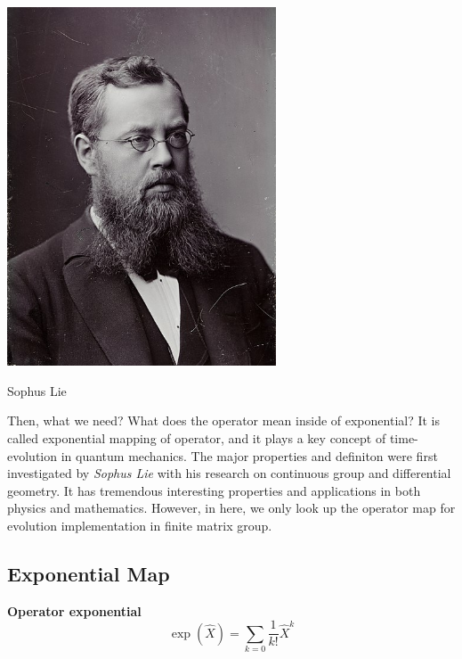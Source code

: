 
\begin{marginfigure}
    \centering
    \includegraphics[width=0.6\textwidth]{media/picture_Sophus_Lie.jpg}
    \caption{Sophus Lie}
    \label{fig:sopus_lie_picture}
\end{marginfigure}

Then, what we need? What does the operator mean inside of exponential?
It is called exponential mapping of operator, and 
it plays a key concept of time-evolution in quantum mechanics.
The major properties and definiton were first investigated by \textit{Sophus Lie} with his research on continuous group and 
differential geometry.
It has tremendous interesting properties and applications in both physics and mathematics.
However, in here, we only look up 
the operator map for evolution implementation in finite matrix group.

\subsection{Exponential Map}

\begin{definition}{\textbf{Operator exponential}}
    \begin{equation}
        \exp(\hat{X}) = \sum_{k=0} \frac{1}{k !} \hat{X}^k
    \end{equation}
\end{definition}

